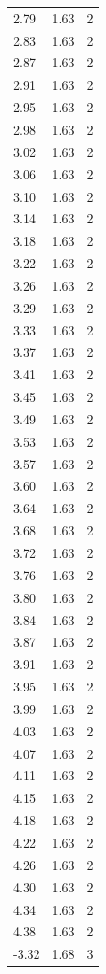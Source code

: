 \begin{longtable}{lrr}
  2.79 & 1.63 & 2 \\
  2.83 & 1.63 & 2 \\
  2.87 & 1.63 & 2 \\
  2.91 & 1.63 & 2 \\
  2.95 & 1.63 & 2 \\
  2.98 & 1.63 & 2 \\
  3.02 & 1.63 & 2 \\
  3.06 & 1.63 & 2 \\
  3.10 & 1.63 & 2 \\
  3.14 & 1.63 & 2 \\
  3.18 & 1.63 & 2 \\
  3.22 & 1.63 & 2 \\
  3.26 & 1.63 & 2 \\
  3.29 & 1.63 & 2 \\
  3.33 & 1.63 & 2 \\
  3.37 & 1.63 & 2 \\
  3.41 & 1.63 & 2 \\
  3.45 & 1.63 & 2 \\
  3.49 & 1.63 & 2 \\
  3.53 & 1.63 & 2 \\
  3.57 & 1.63 & 2 \\
  3.60 & 1.63 & 2 \\
  3.64 & 1.63 & 2 \\
  3.68 & 1.63 & 2 \\
  3.72 & 1.63 & 2 \\
  3.76 & 1.63 & 2 \\
  3.80 & 1.63 & 2 \\
  3.84 & 1.63 & 2 \\
  3.87 & 1.63 & 2 \\
  3.91 & 1.63 & 2 \\
  3.95 & 1.63 & 2 \\
  3.99 & 1.63 & 2 \\
  4.03 & 1.63 & 2 \\
  4.07 & 1.63 & 2 \\
  4.11 & 1.63 & 2 \\
  4.15 & 1.63 & 2 \\
  4.18 & 1.63 & 2 \\
  4.22 & 1.63 & 2 \\
  4.26 & 1.63 & 2 \\
  4.30 & 1.63 & 2 \\
  4.34 & 1.63 & 2 \\
  4.38 & 1.63 & 2 \\
  -3.32 & 1.68 & 3 \\

\end{longtable}
